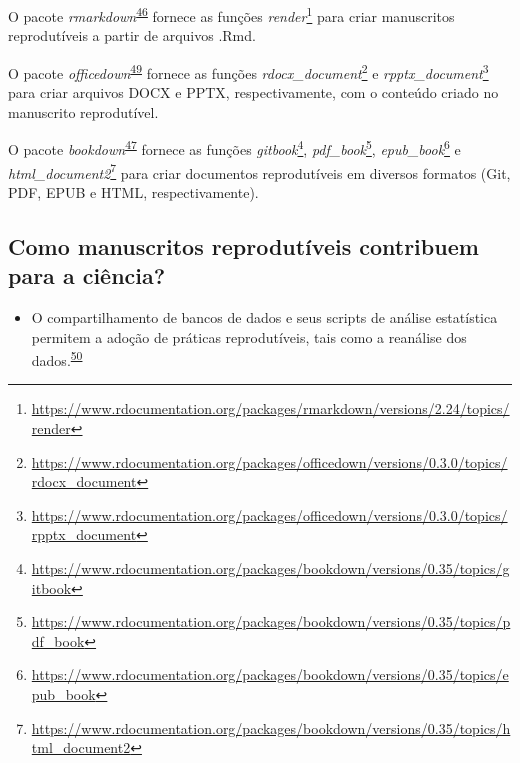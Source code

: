 \documentclass[
  a4paper,
]{book}
\providecommand{\tightlist}{%
  \setlength{\itemsep}{0pt}\setlength{\parskip}{0pt}}
\renewcommand{\href}[2]{#2\footnote{\url{#1}}}
\newenvironment{infobox}[1]
  {
  \begin{itemize}
  \renewcommand{\labelitemi}{
    \raisebox{-.7\height}[0pt][0pt]{
      {\setkeys{Gin}{width=3em,keepaspectratio}
        \texttt{[image: \#1]}}
    }
  }
  \setlength{\fboxsep}{1em}
  \begin{blackbox}
  \item
  }
  {
  \end{blackbox}
  \end{itemize}
  }
\begin{document}
\begin{infobox}{images/Rlogo}
O pacote \emph{rmarkdown}\textsuperscript{\protect\hyperlink{ref-rmarkdown}{46}} fornece as funções \href{https://www.rdocumentation.org/packages/rmarkdown/versions/2.24/topics/render}{\emph{render}} para criar manuscritos reprodutíveis a partir de arquivos .Rmd.

\end{infobox}

\begin{infobox}{images/Rlogo}
O pacote \emph{officedown}\textsuperscript{\protect\hyperlink{ref-officedown}{49}} fornece as funções \href{https://www.rdocumentation.org/packages/officedown/versions/0.3.0/topics/rdocx_document}{\emph{rdocx\_document}} e \href{https://www.rdocumentation.org/packages/officedown/versions/0.3.0/topics/rpptx_document}{\emph{rpptx\_document}} para criar arquivos DOCX e PPTX, respectivamente, com o conteúdo criado no manuscrito reprodutível.

\end{infobox}

\begin{infobox}{images/Rlogo}
O pacote \emph{bookdown}\textsuperscript{\protect\hyperlink{ref-bookdown-2}{47}} fornece as funções \href{https://www.rdocumentation.org/packages/bookdown/versions/0.35/topics/gitbook}{\emph{gitbook}}, \href{https://www.rdocumentation.org/packages/bookdown/versions/0.35/topics/pdf_book}{\emph{pdf\_book}}, \href{https://www.rdocumentation.org/packages/bookdown/versions/0.35/topics/epub_book}{\emph{epub\_book}} e \href{https://www.rdocumentation.org/packages/bookdown/versions/0.35/topics/html_document2}{\emph{html\_document2}} para criar documentos reprodutíveis em diversos formatos (Git, PDF, EPUB e HTML, respectivamente).

\end{infobox}

\hypertarget{como-manuscritos-reprodutuxedveis-contribuem-para-a-ciuxeancia}{%
\subsection{Como manuscritos reprodutíveis contribuem para a ciência?}\label{como-manuscritos-reprodutuxedveis-contribuem-para-a-ciuxeancia}}

\begin{itemize}
\tightlist
\item
  O compartilhamento de bancos de dados e seus scripts de análise estatística permitem a adoção de práticas reprodutíveis, tais como a reanálise dos dados.\textsuperscript{\protect\hyperlink{ref-ioannidis2014}{50}}
\end{itemize}
\end{document}
